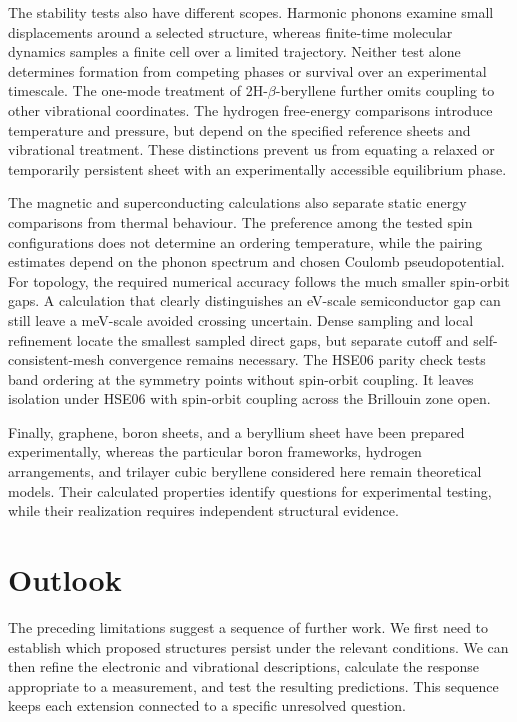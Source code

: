 The stability tests also have different scopes.
Harmonic phonons examine small displacements around a selected structure, whereas finite-time molecular dynamics samples a finite cell over a limited trajectory.
Neither test alone determines formation from competing phases or survival over an experimental timescale.
The one-mode treatment of 2H-$\beta$-beryllene further omits coupling to other vibrational coordinates.
The hydrogen free-energy comparisons introduce temperature and pressure, but depend on the specified reference sheets and vibrational treatment.
These distinctions prevent us from equating a relaxed or temporarily persistent sheet with an experimentally accessible equilibrium phase.

The magnetic and superconducting calculations also separate static energy comparisons from thermal behaviour.
The preference among the tested spin configurations does not determine an ordering temperature, while the pairing estimates depend on the phonon spectrum and chosen Coulomb pseudopotential.
For topology, the required numerical accuracy follows the much smaller spin-orbit gaps.
A calculation that clearly distinguishes an \unit{\electronvolt}-scale semiconductor gap can still leave a \unit{\milli\electronvolt}-scale avoided crossing uncertain.
Dense sampling and local refinement locate the smallest sampled direct gaps, but separate cutoff and self-consistent-mesh convergence remains necessary.
The HSE06 parity check tests band ordering at the symmetry points without spin-orbit coupling.
It leaves isolation under HSE06 with spin-orbit coupling across the Brillouin zone open.

Finally, graphene, boron sheets, and a beryllium sheet have been prepared experimentally, whereas the particular boron frameworks, hydrogen arrangements, and trilayer cubic beryllene considered here remain theoretical models.
Their calculated properties identify questions for experimental testing, while their realization requires independent structural evidence.

\section{Outlook}
\label{sec:conclusions_outlook}

The preceding limitations suggest a sequence of further work.
We first need to establish which proposed structures persist under the relevant conditions.
We can then refine the electronic and vibrational descriptions, calculate the response appropriate to a measurement, and test the resulting predictions.
This sequence keeps each extension connected to a specific unresolved question.

